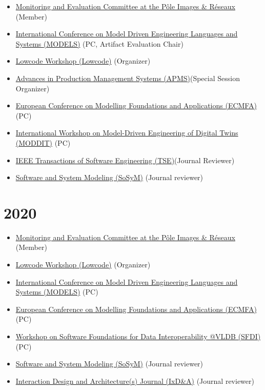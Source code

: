 \begin{itemize}
\tightlist
\item
  \href{http://www.images-et-reseaux.com/en}{Monitoring and Evaluation
  Committee at the Pôle Images \& Réseaux} (Member)
\item
  \href{https://modelsconference.org/}{International Conference on Model
  Driven Engineering Languages and Systems (MODELS)} (PC, Artifact
  Evaluation Chair)
\item
  \href{https://lowcode-workshop.github.io/}{Lowcode Workshop (Lowcode)}
  (Organizer)
\item
  \href{https://www.apms-conference.org/past-conferences/apms-2021/}{Advances
  in Production Management Systems (APMS)}(Special Session Organizer)
\item
  \href{https://staf2019.win.tue.nl/events/ecmfa20/}{European Conference
  on Modelling Foundations and Applications (ECMFA)} (PC)
\item
  \href{https://gemoc.org/events/moddit2021.html}{International Workshop
  on Model-Driven Engineering of Digital Twins (MODDIT)} (PC)
\item
  \href{https://www.computer.org/web/tse}{IEEE Transactions of Software
  Engineering (TSE)}(Journal Reviewer)
\item
  \href{http://www.sosym.org/}{Software and System Modeling (SoSyM)}
  (Journal reviewer)
\end{itemize}

\hypertarget{section-3}{%
\section{2020}\label{section-3}}

\begin{itemize}
\tightlist
\item
  \href{http://www.images-et-reseaux.com/en}{Monitoring and Evaluation
  Committee at the Pôle Images \& Réseaux} (Member)
\item
  \href{https://lowcode-workshop.github.io/}{Lowcode Workshop (Lowcode)}
  (Organizer)
\item
  \href{https://modelsconference.org/}{International Conference on Model
  Driven Engineering Languages and Systems (MODELS)} (PC)
\item
  \href{https://staf2019.win.tue.nl/events/ecmfa20/}{European Conference
  on Modelling Foundations and Applications (ECMFA)} (PC)
\item
  \href{http://www.biscuits.work/fourth-workshop/}{Workshop on Software
  Foundations for Data Interoperability @VLDB (SFDI)} (PC)
\item
  \href{http://www.sosym.org/}{Software and System Modeling (SoSyM)}
  (Journal reviewer)
\item
  \href{http://interfacce.mifav.uniroma2.it/inevent/events/idea2010/?s=9}{Interaction
  Design and Architecture(s) Journal (IxD\&A)} (Journal reviewer)
\end{itemize}

